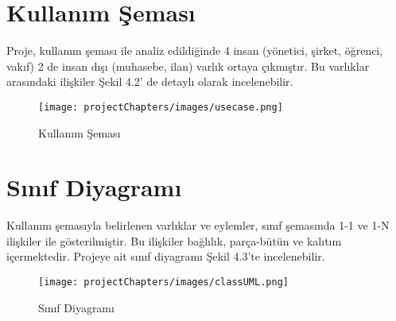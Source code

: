 \section{Kullanım Şeması}
Proje, kullanım şeması ile analiz edildiğinde 4 insan (yönetici, şirket, öğrenci, vakıf) 2 de insan dışı (muhasebe, ilan)
varlık ortaya çıkmıştır. Bu varlıklar arasındaki ilişkiler Şekil 4.2' de detaylı olarak incelenebilir.

\begin{figure}[]
    \centering
        \texttt{[image: projectChapters/images/usecase.png]}
    \caption{Kullanım Şeması}
    \label{ganttLabel}
\end{figure}

\section{Sınıf Diyagramı}
Kullanım şemasıyla belirlenen varlıklar ve eylemler, sınıf şemasında 1-1 ve 1-N ilişkiler ile gösterilmiştir. 
Bu ilişkiler bağlılık, parça-bütün ve kalıtım içermektedir. Projeye ait sınıf diyagramı Şekil 4.3'te incelenebilir.

\begin{figure}[]
    \centering
        \texttt{[image: projectChapters/images/classUML.png]}
    \caption{Sınıf Diyagramı}
    \label{ganttLabel}
\end{figure}


